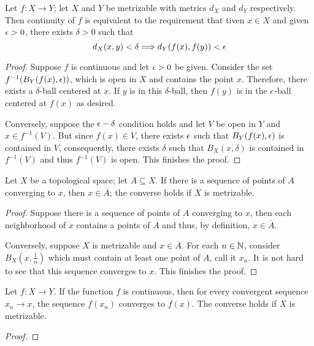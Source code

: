 \begin{theorem}
    Let $f:X\to Y$; let $X$ and $Y$ be metrizable with metrics $d_X$ and $d_Y$ respectively. Then continuity of $f$ is equivalent to the requirement that tiven $x\in X$ and given $\epsilon > 0$, there exists $\delta > 0$ such that 
    \begin{equation*}
        d_X(x,y) <\delta \Longrightarrow d_Y(f(x), f(y)) < \epsilon
    \end{equation*}
\end{theorem}
\begin{proof}
    Suppose $f$ is continuous and let $\epsilon > 0$ be given. Consider the set $f^{-1}(B_Y(f(x), \epsilon))$, which is open in $X$ and contains the point $x$. Therefore, there exists a $\delta$-ball centered at $x$. If $y$ is in this $\delta$-ball, then $f(y)$ is in the $\epsilon$-ball centered at $f(x)$ as desired.

    Conversely, suppose the $\epsilon-\delta$ condition holds and let $V$ be open in $Y$ and $x\in f^{-1}(V)$. But since $f(x)\in V$, there exists $\epsilon$ such that $B_Y(f(x),\epsilon)$ is contained in $V$, consequently, there exists $\delta$ such that $B_X(x, \delta)$ is contained in $f^{-1}(V)$ and thus $f^{-1}(V)$ is open. This finishes the proof.
\end{proof}

\begin{lemma}
    Let $X$ be a topological space; let $A\subseteq X$. If there is a sequence of points of $A$ converging to $x$, then $x\in\overline{A}$; the converse holds if $X$ is metrizable.
\end{lemma}
\begin{proof}
    Suppose there is a sequence of points of $A$ converging to $x$, then each neighborhood of $x$ contains a points of $A$ and thus, by definition, $x\in\overline{A}$.

    Conversely, suppose $X$ is metrizable and $x\in\overline{A}$. For each $n\in\mathbb{N}$, consider $B_X(x,\frac{1}{n})$ which must contain at least one point of $A$, call it $x_n$. It is not hard to see that this sequence converges to $x$. This finishes the proof.
\end{proof}

\begin{theorem}
    Let $f:X\to Y$. If the function $f$ is continuous, then for every convergent sequence $x_n\to x$, the sequence $f(x_n)$ converges to $f(x)$. The converse holds if $X$ is metrizable.
\end{theorem}
\begin{proof}
\end{proof}